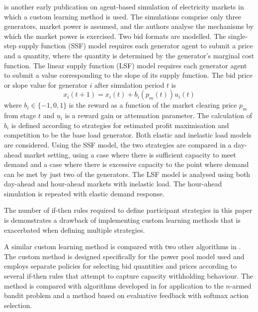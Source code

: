  is another early publication on agent-based simulation of
electricity markets in which a custom learning method is used.  The simulations
comprise only three generators, market power is assumed, and the authors
analyse the mechanisms by which the market power is exercised.  Two bid formats
are modelled.  The single-step supply function (SSF) model requires each
generator agent to submit a price and a quantity, where the quantity is
determined by the generator's marginal cost function.  The linear supply
function (LSF) model requires each generator agent to submit a value
corresponding to the slope of its supply function.  The bid price or slope value for generator
$i$ after simulation period $t$ is
\begin{equation}
x_i(t+1) = x_i(t) + b_i (p_m(t)) u_i(t)
\end{equation}
where $b_i \in \lbrace-1,0,1\rbrace$ is the reward as a function of the market
clearing price $p_m$ from stage $t$ and $u_i$ is a reward gain or attenuation
parameter.  The calculation of $b_i$ is defined according to strategies for
estimated profit maximisation and competition to be the base load generator.
Both elastic and inelastic load models are considered.  Using the SSF
model, the two strategies are compared in a day-ahead market setting,
using a case where there is sufficient capacity to meet demand and a case where
there is excessive capacity to the point where demand can be met by just two of
the generators.  The LSF model is analysed using both day-ahead and
hour-ahead markets with inelastic load.  The hour-ahead simulation is repeated
with elastic demand response.

The number of if-then rules required to define participant strategies in this
paper is demonstrates a drawback of implementing custom learning methods that
is exacerbated when defining multiple strategies.

A similar custom learning method is compared with two other algorithms in
.  The custom method is designed specifically for the power pool model used and employs separate policies for
selecting bid quantities and prices according to several if-then rules that
attempt to capture capacity withholding behaviour.  The method is compared
with algorithms developed in  for application to the $n$-armed
bandit problem \cite[\S2.1]{robbins:53,suttonbarto:1998} and a method based on
evaluative feedback with softmax action selection.

